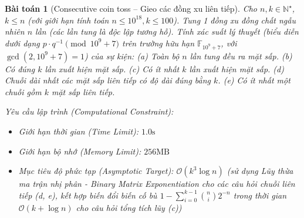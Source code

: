 \documentclass{article}
\newtheorem{baitoan}{Bài toán}
\begin{document}
\begin{baitoan}[Consecutive coin toss -- Gieo các đồng xu liên tiếp]
	Cho $n,k\in\mathbb{N}^\star$, $k\le n$ (với giới hạn tính toán $n \le 10^{18}, k \le 100$). Tung 1 đồng xu đồng chất ngẫu nhiên $n$ lần (các lần tung là độc lập tương hỗ). Tính xác suất lý thuyết (biểu diễn dưới dạng $p \cdot q^{-1} \pmod{10^9+7}$ trên trường hữu hạn $\mathbb{F}_{10^9+7}$, với $\gcd(2, 10^9+7) = 1$) của sự kiện: (a) Toàn bộ $n$ lần tung đều ra mặt sấp. (b) Có đúng $k$ lần xuất hiện mặt sấp. (c) Có ít nhất $k$ lần xuất hiện mặt sấp. (d) Chuỗi dài nhất các mặt sấp liên tiếp có độ dài đúng bằng $k$. (e) Có ít nhất một chuỗi gồm $k$ mặt sấp liên tiếp.

    \vspace{0.5em}
    \emph{Yêu cầu lập trình (Computational Constraint):}
    \begin{itemize}
        \item Giới hạn thời gian (Time Limit): $1.0\mathrm{s}$
        \item Giới hạn bộ nhớ (Memory Limit): $256\mathrm{MB}$
        \item Mục tiêu độ phức tạp (Asymptotic Target): $\mathcal{O}(k^3 \log n)$ (sử dụng Lũy thừa ma trận nhị phân - Binary Matrix Exponentiation cho các câu hỏi chuỗi liên tiếp (d, e), kết hợp biến đổi biến cố bù $1 - \sum_{i=0}^{k-1} \binom{n}{i} 2^{-n}$ trong thời gian $\mathcal{O}(k + \log n)$ cho câu hỏi tổng tích lũy (c))
    \end{itemize}
\end{baitoan}
\end{document}
